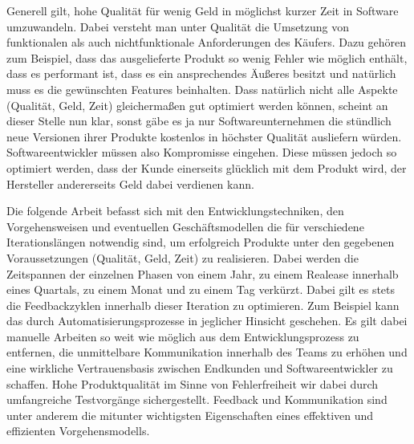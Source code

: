 Generell gilt, hohe Qualität für wenig Geld in möglichst kurzer Zeit in Software umzuwandeln. Dabei versteht man unter Qualität die Umsetzung von funktionalen als auch nichtfunktionale Anforderungen des Käufers. Dazu gehören zum Beispiel, dass das ausgelieferte Produkt so wenig Fehler wie möglich enthält, dass es performant ist, dass es ein ansprechendes Äußeres besitzt und natürlich muss es die gewünschten Features beinhalten. Dass natürlich nicht alle Aspekte (Qualität, Geld, Zeit) gleichermaßen gut optimiert werden können, scheint an dieser Stelle nun klar, sonst gäbe es ja nur Softwareunternehmen die stündlich neue Versionen ihrer Produkte kostenlos in höchster Qualität ausliefern würden. Softwareentwickler müssen also Kompromisse eingehen. Diese müssen jedoch so optimiert werden, dass der Kunde einerseits glücklich mit dem Produkt wird, der Hersteller andererseits Geld dabei verdienen kann. 

Die folgende Arbeit befasst sich mit den Entwicklungstechniken, den Vorgehensweisen und eventuellen Geschäftsmodellen die für verschiedene Iterationslängen notwendig sind, um erfolgreich Produkte unter den gegebenen Voraussetzungen (Qualität, Geld, Zeit) zu realisieren. Dabei werden die Zeitspannen der einzelnen Phasen von einem Jahr, zu einem Realease innerhalb eines Quartals, zu einem Monat und zu einem Tag verkürzt. Dabei gilt es stets die Feedbackzyklen innerhalb dieser Iteration zu optimieren. Zum Beispiel kann das durch Automatisierungsprozesse in jeglicher Hinsicht geschehen. Es gilt dabei manuelle Arbeiten so weit wie möglich aus dem Entwicklungsprozess zu entfernen, die unmittelbare Kommunikation innerhalb des Teams zu erhöhen und eine wirkliche Vertrauensbasis zwischen Endkunden und Softwareentwickler zu schaffen. Hohe Produktqualität im Sinne von Fehlerfreiheit wir dabei durch umfangreiche Testvorgänge sichergestellt. Feedback und Kommunikation sind unter anderem die mitunter wichtigsten Eigenschaften eines effektiven und effizienten Vorgehensmodells.